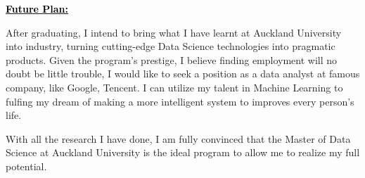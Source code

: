 \documentclass{article}
\newcommand{\statement}[1]{\par\medskip
  \underline{\textcolor{black}{\textbf{#1:}}}\space
}
\begin{document}
\statement{Future Plan}

After graduating, I intend to bring what I have learnt at Auckland University into industry, turning cutting-edge Data Science technologies into pragmatic products. Given the program's prestige, I believe finding employment will no doubt be little trouble, I would like to seek a position as a data analyst at famous company, like Google, Tencent. I can utilize my talent in Machine Learning to fulfing my dream of making a more intelligent system to improves every person's life.

With all the research I have done, I am fully convinced that the Master of Data Science at Auckland University is the ideal program to allow me to realize my full potential.
\end{document}
